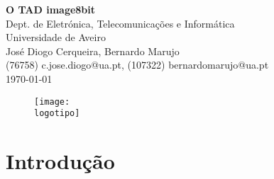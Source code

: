 \documentclass{report}
\begin{document}
%
\def\titulo{O TAD image8bit}
\def\data{\today}
\def\autores{José Diogo Cerqueira, Bernardo Marujo}
\def\autorescontactos{(76758) c.jose.diogo@ua.pt, (107322) bernardomarujo@ua.pt}
\def\departamento{Dept. de Eletrónica, Telecomunicações e Informática}
\def\empresa{Universidade de Aveiro}
\def\logotipo{ua.pdf}
%
%

%
%
\begin{titlepage}

\begin{center}
%
\vspace*{50mm}
%
{\Huge\textbf{\titulo}}\\
{\Large \departamento\\ \empresa}\\
%
\vspace{10mm}
%
%
{\LARGE \autores\\ \autorescontactos} \\ 
%
\vspace{10mm}
%
\data
%
\vspace{20mm}
%
\begin{figure}[h]
\center
\texttt{[image: \\logotipo]}
\end{figure}
%
\end{center}
%
\end{titlepage}


\tableofcontents



\clearpage
{}


\chapter{Introdução}









\printbibliography
\end{document}
